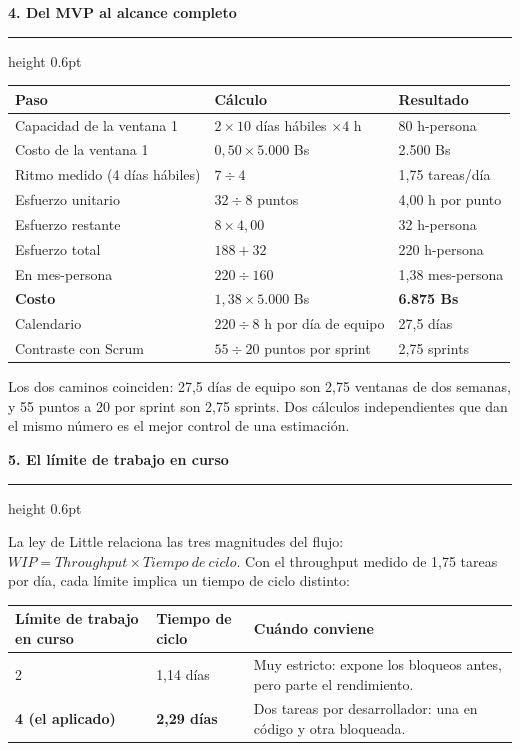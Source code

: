 \documentclass[10pt,letterpaper]{article}
\newcommand{\seccion}[1]{%
  \par\vspace{7pt}%
  {\color{azul}\bfseries\large #1}\par
  \vspace{1pt}%
  {\color{linea}\hrule height 0.6pt}\vspace{4pt}%
}
\begin{document}
\seccion{4. Del MVP al alcance completo}

{\small
\begin{tabular}{@{}L{0.30\textwidth}L{0.38\textwidth}R{0.26\textwidth}@{}}
\toprule
{}
{\color{azul}\bfseries Paso} & {\color{azul}\bfseries Cálculo} & {\color{azul}\bfseries Resultado} \\
\midrule
Capacidad de la ventana 1 & $2 \times 10$ días hábiles $\times 4$ h & 80 h-persona \\
Costo de la ventana 1 & $0{,}50 \times 5.000$ Bs & 2.500 Bs \\
Ritmo medido (4 días hábiles) & $7 \div 4$ & 1,75 tareas/día \\
Esfuerzo unitario & $32 \div 8$ puntos & 4,00 h por punto \\
Esfuerzo restante & $8 \times 4{,}00$ & 32 h-persona \\
Esfuerzo total & $188 + 32$ & 220 h-persona \\
En mes-persona & $220 \div 160$ & 1,38 mes-persona \\
\textbf{Costo} & $1{,}38 \times 5.000$ Bs & \textbf{6.875 Bs} \\
Calendario & $220 \div 8$ h por día de equipo & 27,5 días \\
Contraste con Scrum & $55 \div 20$ puntos por sprint & 2,75 sprints \\
\bottomrule
\end{tabular}}

\vspace{3pt}
{\small\color{gris} Los dos caminos coinciden: 27,5 días de equipo son 2,75
ventanas de dos semanas, y 55 puntos a 20 por sprint son 2,75 sprints. Dos
cálculos independientes que dan el mismo número es el mejor control de una
estimación.}

\seccion{5. El límite de trabajo en curso}

La ley de Little relaciona las tres magnitudes del flujo:
$WIP = Throughput \times Tiempo\ de\ ciclo$. Con el throughput medido de
1,75 tareas por día, cada límite implica un tiempo de ciclo distinto:

{\small
\begin{tabular}{@{}L{0.34\textwidth}L{0.30\textwidth}L{0.30\textwidth}@{}}
\toprule
{}
{\color{azul}\bfseries Límite de trabajo en curso} &
{\color{azul}\bfseries Tiempo de ciclo} &
{\color{azul}\bfseries Cuándo conviene} \\
 & 1,14 días & Muy estricto: expone los bloqueos antes, pero parte el rendimiento. \\
\textbf{4 (el aplicado)} & \textbf{2,29 días} & Dos tareas por desarrollador: una en código y otra bloqueada. \\
\bottomrule
\end{tabular}}
\end{document}

